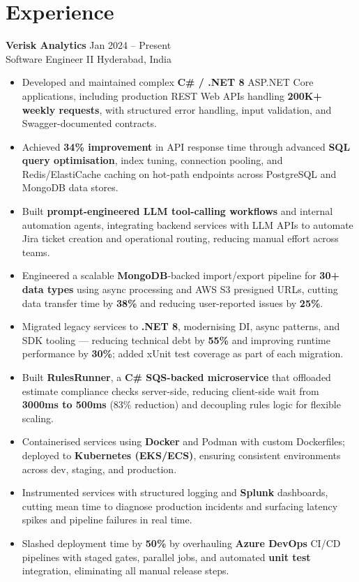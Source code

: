 \documentclass[10pt,letterpaper]{article}
\newcommand{\resumeSubheading}[4]{%
  \textbf{#1} \hfill #2 \\
  #3 \hfill #4 \\
}
\begin{document}
\section*{Experience}
\resumeSubheading{Verisk Analytics}{Jan 2024 -- Present}{Software Engineer II}{Hyderabad, India}
\begin{itemize}
    \item Developed and maintained complex \textbf{C\# / .NET 8} ASP.NET Core applications, including production REST Web APIs handling \textbf{200K+ weekly requests}, with structured error handling, input validation, and Swagger-documented contracts.
    \item Achieved \textbf{34\% improvement} in API response time through advanced \textbf{SQL query optimisation}, index tuning, connection pooling, and Redis/ElastiCache caching on hot-path endpoints across PostgreSQL and MongoDB data stores.
    \item Built \textbf{prompt-engineered LLM tool-calling workflows} and internal automation agents, integrating backend services with LLM APIs to automate Jira ticket creation and operational routing, reducing manual effort across teams.
    \item Engineered a scalable \textbf{MongoDB}-backed import/export pipeline for \textbf{30+ data types} using async processing and AWS S3 presigned URLs, cutting data transfer time by \textbf{38\%} and reducing user-reported issues by \textbf{25\%}.
    \item Migrated legacy services to \textbf{.NET 8}, modernising DI, async patterns, and SDK tooling --- reducing technical debt by \textbf{55\%} and improving runtime performance by \textbf{30\%}; added xUnit test coverage as part of each migration.
    \item Built \textbf{RulesRunner}, a \textbf{C\# SQS-backed microservice} that offloaded estimate compliance checks server-side, reducing client-side wait from \textbf{3000ms to 500ms} (83\% reduction) and decoupling rules logic for flexible scaling.
    \item Containerised services using \textbf{Docker} and Podman with custom Dockerfiles; deployed to \textbf{Kubernetes (EKS/ECS)}, ensuring consistent environments across dev, staging, and production.
    \item Instrumented services with structured logging and \textbf{Splunk} dashboards, cutting mean time to diagnose production incidents and surfacing latency spikes and pipeline failures in real time.
    \item Slashed deployment time by \textbf{50\%} by overhauling \textbf{Azure DevOps} CI/CD pipelines with staged gates, parallel jobs, and automated \textbf{unit test} integration, eliminating all manual release steps.
\end{itemize}
\end{document}
